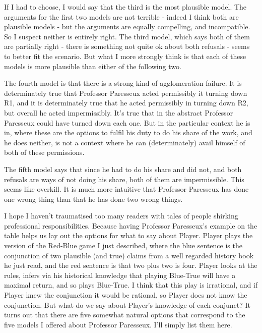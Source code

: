 \documentclass[11pt,]{book}
\begin{document}
If I had to choose, I would say that the third is the most plausible model. The arguments for the first two models are not terrible - indeed I think both are plausible models - but the arguments are equally compelling, and incompatible. So I suspect neither is entirely right. The third model, which says both of them are partially right - there is something not quite ok about both refusals - seems to better fit the scenario. But what I more strongly think is that each of these models is more plausible than either of the following two.

The fourth model is that there is a strong kind of agglomeration failure. It is determinately true that Professor Paresseux acted permissibly it turning down R1, and it is determinately true that he acted permissibly in turning down R2, but overall he acted impermissibly. It's true that in the abstract Professor Paresseux could have turned down each one. But in the particular context he is in, where these are the options to fulfil his duty to do his share of the work, and he does neither, is not a context where he can (determinately) avail himself of both of these permissions.

The fifth model says that since he had to do his share and did not, and both refusals are ways of not doing his share, both of them are impermissible. This seems like overkill. It is much more intuitive that Professor Paresseux has done one wrong thing than that he has done two wrong things.

I hope I haven't traumatised too many readers with tales of people shirking professional responsibilities. Because having Professor Paresseux's example on the table helps us lay out the options for what to say about Player. Player plays the version of the Red-Blue game I just described, where the blue sentence is the conjunction of two plausible (and true) claims from a well regarded history book he just read, and the red sentence is that two plus two is four. Player looks at the rules, infers via his historical knowledge that playing Blue-True will have a maximal return, and so plays Blue-True. I think that this play is irrational, and if Player knew the conjunction it would be rational, so Player does not know the conjunction. But what do we say about Player's knowledge of each conjunct? It turns out that there are five somewhat natural options that correspond to the five models I offered about Professor Paresseux. I'll simply list them here.
\end{document}
